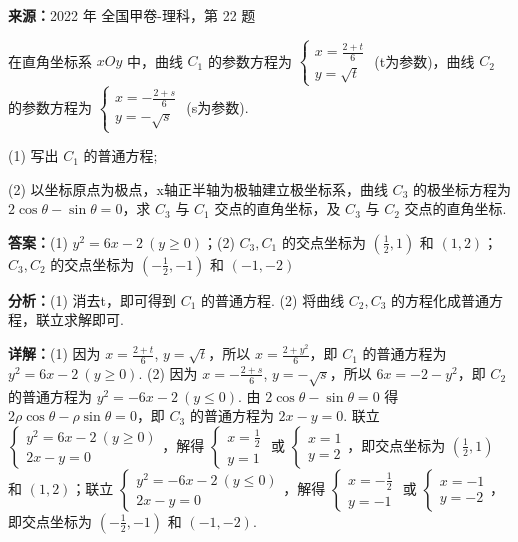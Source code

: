\begin{question}[points=10]
\textbf{来源：}2022 年 全国甲卷-理科，第 22 题\par
在直角坐标系 $xOy$ 中，曲线 $C_1$ 的参数方程为 $\begin{cases} x=\frac{2+t}{6} \\ y=\sqrt{t} \end{cases}$ (t为参数)，曲线 $C_2$ 的参数方程为 $\begin{cases} x=-\frac{2+s}{6} \\ y=-\sqrt{s} \end{cases}$ (s为参数).

(1) 写出 $C_1$ 的普通方程;

(2) 以坐标原点为极点，x轴正半轴为极轴建立极坐标系，曲线 $C_3$ 的极坐标方程为 $2\cos\theta-\sin\theta=0$，求 $C_3$ 与 $C_1$ 交点的直角坐标，及 $C_3$ 与 $C_2$ 交点的直角坐标.
\begin{solution}
\textbf{答案：}(1) $y^2=6x-2\ (y\geq0)$；(2) $C_3,C_1$ 的交点坐标为 $(\frac{1}{2},1)$ 和 $(1,2)$；$C_3,C_2$ 的交点坐标为 $(-\frac{1}{2},-1)$ 和 $(-1,-2)$

\textbf{分析：}(1) 消去t，即可得到 $C_1$ 的普通方程. (2) 将曲线 $C_2, C_3$ 的方程化成普通方程，联立求解即可.

\textbf{详解：}(1) 因为 $x=\frac{2+t}{6}$, $y=\sqrt{t}$，所以 $x=\frac{2+y^2}{6}$，即 $C_1$ 的普通方程为 $y^2=6x-2\ (y\geq0)$.
(2) 因为 $x=-\frac{2+s}{6}$, $y=-\sqrt{s}$，所以 $6x=-2-y^2$，即 $C_2$ 的普通方程为 $y^2=-6x-2\ (y\leq0)$. 由 $2\cos\theta-\sin\theta=0$ 得 $2\rho\cos\theta-\rho\sin\theta=0$，即 $C_3$ 的普通方程为 $2x-y=0$. 联立 $\begin{cases} y^2=6x-2\ (y\geq0) \\ 2x-y=0 \end{cases}$，解得 $\begin{cases} x=\frac{1}{2} \\ y=1 \end{cases}$ 或 $\begin{cases} x=1 \\ y=2 \end{cases}$，即交点坐标为 $(\frac{1}{2},1)$ 和 $(1,2)$；联立 $\begin{cases} y^2=-6x-2\ (y\leq0) \\ 2x-y=0 \end{cases}$，解得 $\begin{cases} x=-\frac{1}{2} \\ y=-1 \end{cases}$ 或 $\begin{cases} x=-1 \\ y=-2 \end{cases}$，即交点坐标为 $(-\frac{1}{2},-1)$ 和 $(-1,-2)$.
\end{solution}
\end{question}

